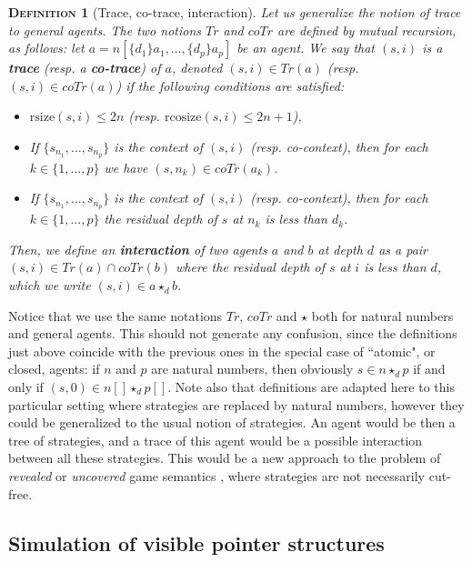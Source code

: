 \documentclass{article}
\newcommand{\size}{\mathrm{rsize}}
\newcommand{\cosize}{\mathrm{rcosize}}
\newtheorem{definition}{\textsc{Definition}}
\begin{document}
\begin{definition}[Trace, co-trace, interaction]
Let us generalize the notion of trace to general agents. The two notions $Tr$ and $coTr$ are defined by mutual recursion, as follows:
let $a = n[\{d_1\}a_1, \dots, \{d_p\}a_p]$ be an agent. We say that $(s,i)$ is a \textbf{trace} (resp. a \textbf{co-trace}) of $a$, denoted $(s,i)\in Tr(a)$ (resp.
$(s, i)\in coTr(a)$) if the following conditions are satisfied:
\begin{itemize}
\item $\size(s, i) \leq 2n$ (resp. $\cosize(s, i) \leq 2n+1$),
\item If $\{s_{n_1}, \dots, s_{n_p}\}$ is the context of $(s,i)$ (resp. co-context), then for each $k\in \{1, \dots, p\}$ we have $(s,n_k) \in coTr(a_k)$.
\item If $\{s_{n_1}, \dots, s_{n_p}\}$ is the context of $(s,i)$ (resp. co-context), then for each $k\in \{1, \dots, p\}$ the residual depth of $s$ at $n_k$ is less than $d_k$.
\end{itemize}
Then, we define an \textbf{interaction} of two agents $a$ and $b$ at depth $d$ as a pair $(s, i)\in Tr(a)\cap coTr(b)$ where the residual depth of $s$ at $i$ is less than $d$, which we write $(s, i)\in a\star_d b$.
\end{definition}
Notice that we use the same notations $Tr$, $coTr$ and $\star$ both for natural numbers and general agents. This should not generate any confusion, since the definitions
just above coincide with the previous ones in the special case of ``atomic", or closed, agents: if $n$ and $p$ are natural numbers, then obviously $s\in n \star_d p$ if and
only if $(s, 0)\in n[] \star_d p[]$.
Note also that definitions are adapted here to this particular setting where strategies are replaced by natural numbers, however they could be generalized to the usual notion
of strategies. An agent would be then a tree of strategies, and a trace of this agent would be a possible interaction between all these strategies. This would
be a new approach to the problem of \emph{revealed} or \emph{uncovered} game semantics \cite{greenland2004game,blum2008thesis}, where strategies are not necessarily cut-free.

\subsection{Simulation of visible pointer structures}
\end{document}
